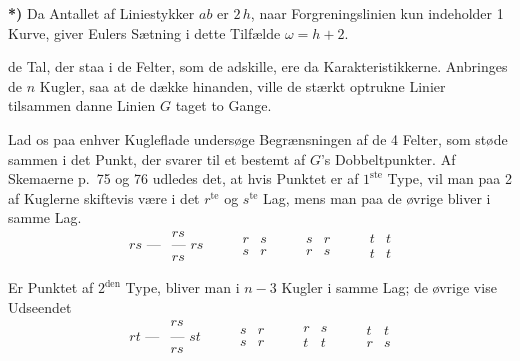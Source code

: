 \documentclass{article}
\begin{document}
\textbf{*)} Da Antallet af Liniestykker $ab$ er $2\,h$, naar Forgreningslinien kun indeholder 1 Kurve, giver Eulers Sætning i dette Tilfælde $\omega = h + 2$.

de Tal, der staa i de Felter, som de adskille, ere da Karakteristikkerne. Anbringes de $n$ Kugler, saa at de dække hinanden, ville de stærkt optrukne Linier tilsammen danne Linien $G$ taget to Gange.

Lad os paa enhver Kugleflade undersøge Begrænsningen af de 4 Felter, som støde sammen i det Punkt, der svarer til et bestemt af $G$'s Dobbeltpunkter. Af Skemaerne p.\ 75 og 76 udledes det, at hvis Punktet er af $1^{\text{ste}}$ Type, vil man paa 2 af Kuglerne skiftevis være i det $r^{\text{te}}$ og $s^{\text{te}}$ Lag, mens man paa de øvrige bliver i samme Lag.
\[
\begin{array}{c|c}
& rs \\
rs\text{ ---} & \text{--- } rs \\
& rs
\end{array}
\qquad
\begin{array}{c||c}
r & s \\
\hline\hline
s & r
\end{array}
\qquad
\begin{array}{c||c}
s & r \\
\hline\hline
r & s
\end{array}
\qquad
\begin{array}{c|c}
t & t \\
\hline
t & t
\end{array}
\]

Er Punktet af $2^{\text{den}}$ Type, bliver man i $n-3$ Kugler i samme Lag; de øvrige vise Udseendet
\[
\begin{array}{c|c}
& rs \\
rt\text{ ---} & \text{--- } st \\
& rs
\end{array}
\qquad
\begin{array}{c||c}
s & r \\
\hline
s & r
\end{array}
\qquad
\begin{array}{c|c}
r & s \\
\hline\hline
t & t
\end{array}
\qquad
\begin{array}{c|c}
t & t \\
\hline\hline
r & s
\end{array}
\]
\end{document}

